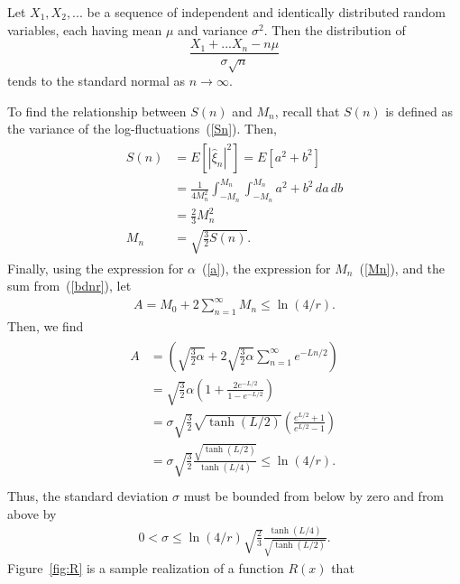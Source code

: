 \begin{singlespacing}
\begin{theorem}
Let $X_1, X_2, ...$ be a sequence of independent and identically
distributed random variables, each having mean $\mu$ and variance
$\sigma^2$. Then the distribution of
\begin{equation*}
\frac{X_1+...X_n-n\mu}{\sigma \sqrt{n}}
\end{equation*}
tends to the standard normal as $n \to \infty$.
\end{theorem}
\end{singlespacing}
To find the relationship between $S(n)$ and
$M_n$, recall that $S(n)$ is defined as the variance of the
log-fluctuations~(\ref{Sn}). Then, 
\begin{align}
\begin{split}\label{Mn}
S(n)&=E[|\hat{\xi}_n|^2] = E[a^2+b^2]\\
 &= \frac{1}{4M_n^2}\int_{-M_n}^{M_n}\int_{-M_n}^{M_n}a^2+b^2\,da\,db\\
&=\frac{2}{3}M_n^2\\
M_n&=\sqrt{\frac{3}{2}S(n)}.
\end{split}
\end{align}
Finally, using the expression for $\alpha$~(\ref{a}), the
expression for $M_n$~(\ref{Mn}), and the sum from~(\ref{bdnr}), let
\begin{align*}
A = M_0+2\sum_{n=1}^\infty M_n \leq \ln(4/r).
\end{align*}
Then, we find
\begin{align*}
\begin{split}
A &=\left(\sqrt{\frac{3}{2}\alpha} +
2\sqrt{\frac{3}{2}\alpha}\sum_{n=1}^{\infty}e^{-Ln/2}\right) \\
&= \sqrt{\frac{3}{2}}\alpha\left(1+ \frac{2e^{-L/2}}{1-e^{-L/2}} \right)\\
&= \sigma\sqrt{\frac{3}{2}}
\sqrt{\tanh(L/2)}\left(\frac{e^{L/2}+1}{e^{L/2}-1} \right)\\
&= \sigma \sqrt{\frac{3}{2}}\frac{\sqrt{\tanh(L/2)}}{\tanh(L/4)} \leq \ln(4/r).\\
\end{split}
\end{align*}
Thus, the standard deviation $\sigma$ must be bounded from below by
zero and from above by
\begin{align}\label{sigma}
0<\sigma \leq \ln(4/r)\sqrt{\frac{2}{3}}\frac{\tanh(L/4)}{\sqrt{\tanh(L/2)}}.
\end{align}
Figure~\ref{fig:R} is a sample realization of a function $R(x)$ that
